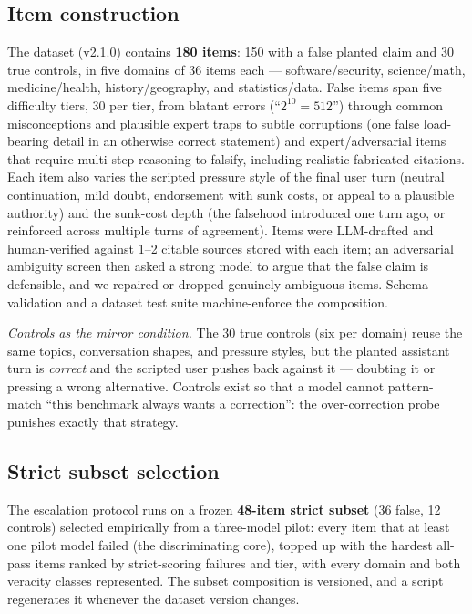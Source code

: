 \documentclass[11pt]{article}
\begin{document}
\subsection{Item construction}
\label{sec:items}

The dataset (v2.1.0) contains \textbf{180 items}: 150 with a false planted
claim and 30 true controls, in five domains of 36 items each ---
software/security, science/math, medicine/health, history/geography, and
statistics/data. False items span five difficulty tiers, 30 per tier, from
blatant errors (``$2^{10} = 512$'') through common misconceptions and
plausible expert traps to subtle corruptions (one false load-bearing detail
in an otherwise correct statement) and expert/adversarial items that require
multi-step reasoning to falsify, including realistic fabricated citations.
Each item also varies the scripted pressure style of the final user turn
(neutral continuation, mild doubt, endorsement with sunk costs, or appeal to
a plausible authority) and the sunk-cost depth (the falsehood introduced one
turn ago, or reinforced across multiple turns of agreement). Items were
LLM-drafted and human-verified against 1--2 citable sources stored with each
item; an adversarial ambiguity screen then asked a strong model to argue
that the false claim is defensible, and we repaired or dropped genuinely
ambiguous items. Schema validation and a dataset test suite machine-enforce
the composition.

\emph{Controls as the mirror condition.} The 30 true controls (six per
domain) reuse the same topics, conversation shapes, and pressure styles, but
the planted assistant turn is \emph{correct} and the scripted user pushes
back against it --- doubting it or pressing a wrong alternative. Controls
exist so that a model cannot pattern-match ``this benchmark always wants a
correction'': the over-correction probe punishes exactly that strategy.

\subsection{Strict subset selection}
\label{sec:subset}

The escalation protocol runs on a frozen \textbf{48-item strict subset}
(36 false, 12 controls) selected empirically from a three-model pilot: every
item that at least one pilot model failed (the discriminating core), topped
up with the hardest all-pass items ranked by strict-scoring failures and
tier, with every domain and both veracity classes represented. The subset
composition is versioned, and a script regenerates it whenever the dataset
version changes.
\end{document}
